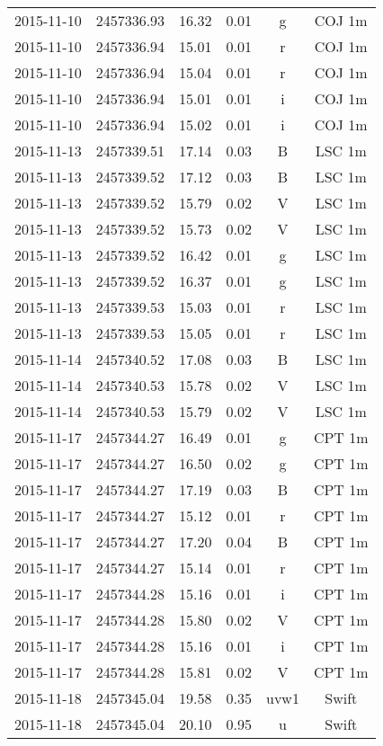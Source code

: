 \begin{table}
\begin{tabular}{cccccc}
2015-11-10 & 2457336.93 & 16.32 & 0.01 & g & COJ 1m \\
2015-11-10 & 2457336.94 & 15.01 & 0.01 & r & COJ 1m \\
2015-11-10 & 2457336.94 & 15.04 & 0.01 & r & COJ 1m \\
2015-11-10 & 2457336.94 & 15.01 & 0.01 & i & COJ 1m \\
2015-11-10 & 2457336.94 & 15.02 & 0.01 & i & COJ 1m \\
2015-11-13 & 2457339.51 & 17.14 & 0.03 & B & LSC 1m \\
2015-11-13 & 2457339.52 & 17.12 & 0.03 & B & LSC 1m \\
2015-11-13 & 2457339.52 & 15.79 & 0.02 & V & LSC 1m \\
2015-11-13 & 2457339.52 & 15.73 & 0.02 & V & LSC 1m \\
2015-11-13 & 2457339.52 & 16.42 & 0.01 & g & LSC 1m \\
2015-11-13 & 2457339.52 & 16.37 & 0.01 & g & LSC 1m \\
2015-11-13 & 2457339.53 & 15.03 & 0.01 & r & LSC 1m \\
2015-11-13 & 2457339.53 & 15.05 & 0.01 & r & LSC 1m \\
2015-11-14 & 2457340.52 & 17.08 & 0.03 & B & LSC 1m \\
2015-11-14 & 2457340.53 & 15.78 & 0.02 & V & LSC 1m \\
2015-11-14 & 2457340.53 & 15.79 & 0.02 & V & LSC 1m \\
2015-11-17 & 2457344.27 & 16.49 & 0.01 & g & CPT 1m \\
2015-11-17 & 2457344.27 & 16.50 & 0.02 & g & CPT 1m \\
2015-11-17 & 2457344.27 & 17.19 & 0.03 & B & CPT 1m \\
2015-11-17 & 2457344.27 & 15.12 & 0.01 & r & CPT 1m \\
2015-11-17 & 2457344.27 & 17.20 & 0.04 & B & CPT 1m \\
2015-11-17 & 2457344.27 & 15.14 & 0.01 & r & CPT 1m \\
2015-11-17 & 2457344.28 & 15.16 & 0.01 & i & CPT 1m \\
2015-11-17 & 2457344.28 & 15.80 & 0.02 & V & CPT 1m \\
2015-11-17 & 2457344.28 & 15.16 & 0.01 & i & CPT 1m \\
2015-11-17 & 2457344.28 & 15.81 & 0.02 & V & CPT 1m \\
2015-11-18 & 2457345.04 & 19.58 & 0.35 & uvw1 & Swift \\
2015-11-18 & 2457345.04 & 20.10 & 0.95 & u & Swift \\

\end{tabular}
\end{table}
